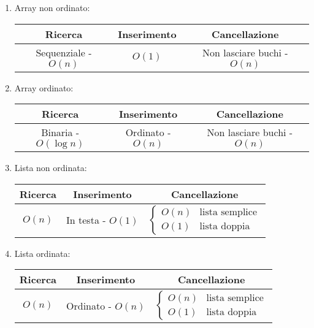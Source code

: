 \documentclass[a4paper,10pt]{article}
\theoremstyle{definition}
\begin{document}
\begin{enumerate}
 \item Array non ordinato: 
 
 \begin{center}
  \begin{tabular}{|c|c|c|}
  \hline
    \textbf{Ricerca} & \textbf{Inserimento} & \textbf{Cancellazione}\\
    \hline
    Sequenziale - $O(n)$ & $O(1)$ & Non lasciare buchi - $O(n)$\\
    \hline
 \end{tabular}
 
 \end{center}
 \item Array ordinato:
 \begin{center}
  
 \begin{tabular}{|c|c|c|}
  \hline
    \textbf{Ricerca} & \textbf{Inserimento} & \textbf{Cancellazione}\\
    \hline
    Binaria - $O(\log n)$ & Ordinato - $O(n)$ & Non lasciare buchi - $O(n)$\\
    \hline
 \end{tabular}

 \end{center}
\item Lista non ordinata:
 \begin{center}
  
 \begin{tabular}{|c|c|c|}
  \hline
    \textbf{Ricerca} & \textbf{Inserimento} & \textbf{Cancellazione}\\
    \hline
    $O(n)$ & In testa - $O(1)$ & $\begin{cases}
                                    O(n) & \text{lista semplice}\\
                                    O(1) & \text{lista doppia}
                                \end{cases}
$\\
    \hline
 \end{tabular}

 \end{center}
 
 \item Lista ordinata:
 \begin{center}
  
 \begin{tabular}{|c|c|c|}
  \hline
    \textbf{Ricerca} & \textbf{Inserimento} & \textbf{Cancellazione}\\
    \hline
    $O(n)$ & Ordinato - $O(n)$ & $\begin{cases}
                                    O(n) & \text{lista semplice}\\
                                    O(1) & \text{lista doppia}
                                \end{cases}
$\\
    \hline
 \end{tabular}

 \end{center}

\end{enumerate}
\end{document}
